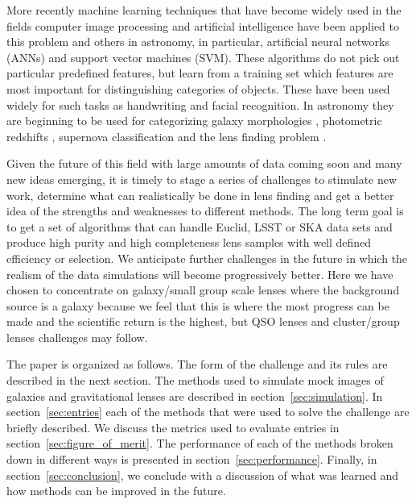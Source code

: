 \documentclass[useAMS,usenatbib]{mnras}
\begin{document}
More recently machine learning techniques that have become widely used in the fields computer image processing and artificial intelligence 
have been applied to this problem and others in astronomy, in particular, artificial neural networks (ANNs) and support vector machines (SVM). These algorithms do not pick out particular predefined features, but learn from a training set which features are most important for distinguishing categories of objects.  These have been used widely for such tasks as handwriting and facial recognition.  In astronomy they are beginning to be used for categorizing galaxy morphologies \citep{2015MNRAS.450.1441D}, photometric redshifts \citep{2017MNRAS.465.1959C,2016PASP..128j4502S,2017NewA...51..169S}, supernova classification \citep{2016ApJS..225...31L} and the lens finding problem \citep{2017MNRAS.471..167J,2017arXiv170207675P,2017MNRAS.465.4325O,2017A&A...597A.135B}.

Given the future of this field with large amounts of data coming soon and many new ideas emerging, it is timely to stage a series of challenges to stimulate new work, determine what can realistically be done in lens finding and get a better idea of the strengths and weaknesses to different methods.  The long term goal is to get a set of algorithms that can handle Euclid, LSST or SKA data sets and produce high purity and high completeness lens samples with well defined efficiency or selection.  We anticipate further challenges in the future in which the realism of the data simulations will become progressively better.  Here we have chosen to concentrate on galaxy/small group scale lenses where the background source is a galaxy because we feel that this is where the most progress can be made and the scientific return is the highest, but QSO lenses and cluster/group lenses challenges may follow.

The paper is organized as follows.  The form of the challenge and its rules are described in the next section.  The methods used to simulate mock images of galaxies and gravitational lenses are described in section~\ref{sec:simulation}.  In section~\ref{sec:entries} each of the methods that were used to solve the challenge are briefly described.  We discuss the metrics used to evaluate entries in section~\ref{sec:figure_of_merit}.  The performance of each of the methods broken down in different ways is presented in section~\ref{sec:performance}.  Finally,  in section~\ref{sec:conclusion}, we conclude with a discussion of what was learned and how methods can be improved in the future.
\end{document}
